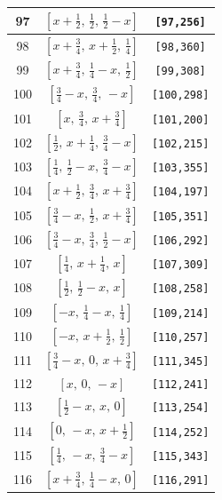 \documentclass[fleqn,8pt]{jsarticle}
\begin{document}
\begin{longtable}{ccc}
97 & $\left[ x + \frac{1}{2},\, \frac{1}{2},\, \frac{1}{2} - x \right]$ & {\tt [97,256]} \\ \hline
98 & $\left[ x + \frac{3}{4},\, x + \frac{1}{2},\, \frac{1}{4} \right]$ & {\tt [98,360]} \\ \hline
99 & $\left[ x + \frac{3}{4},\, \frac{1}{4} - x,\, \frac{1}{2} \right]$ & {\tt [99,308]} \\ \hline
100 & $\left[ \frac{3}{4} - x,\, \frac{3}{4},\, - x \right]$ & {\tt [100,298]} \\ \hline
101 & $\left[ x,\, \frac{3}{4},\, x + \frac{3}{4} \right]$ & {\tt [101,200]} \\ \hline
102 & $\left[ \frac{1}{2},\, x + \frac{1}{4},\, \frac{3}{4} - x \right]$ & {\tt [102,215]} \\ \hline
103 & $\left[ \frac{1}{4},\, \frac{1}{2} - x,\, \frac{3}{4} - x \right]$ & {\tt [103,355]} \\ \hline
104 & $\left[ x + \frac{1}{2},\, \frac{3}{4},\, x + \frac{3}{4} \right]$ & {\tt [104,197]} \\ \hline
105 & $\left[ \frac{3}{4} - x,\, \frac{1}{2},\, x + \frac{3}{4} \right]$ & {\tt [105,351]} \\ \hline
106 & $\left[ \frac{3}{4} - x,\, \frac{3}{4},\, \frac{1}{2} - x \right]$ & {\tt [106,292]} \\ \hline
107 & $\left[ \frac{1}{4},\, x + \frac{1}{4},\, x \right]$ & {\tt [107,309]} \\ \hline
108 & $\left[ \frac{1}{2},\, \frac{1}{2} - x,\, x \right]$ & {\tt [108,258]} \\ \hline
109 & $\left[ - x,\, \frac{1}{4} - x,\, \frac{1}{4} \right]$ & {\tt [109,214]} \\ \hline
110 & $\left[ - x,\, x + \frac{1}{2},\, \frac{1}{2} \right]$ & {\tt [110,257]} \\ \hline
111 & $\left[ \frac{3}{4} - x,\, 0,\, x + \frac{3}{4} \right]$ & {\tt [111,345]} \\ \hline
112 & $\left[ x,\, 0,\, - x \right]$ & {\tt [112,241]} \\ \hline
113 & $\left[ \frac{1}{2} - x,\, x,\, 0 \right]$ & {\tt [113,254]} \\ \hline
114 & $\left[ 0,\, - x,\, x + \frac{1}{2} \right]$ & {\tt [114,252]} \\ \hline
115 & $\left[ \frac{1}{4},\, - x,\, \frac{3}{4} - x \right]$ & {\tt [115,343]} \\ \hline
116 & $\left[ x + \frac{3}{4},\, \frac{1}{4} - x,\, 0 \right]$ & {\tt [116,291]} \\ \hline

\end{longtable}
\end{document}
